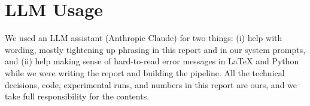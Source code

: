 \documentclass{article}
\begin{document}
\section*{LLM Usage}
We used an LLM assistant (Anthropic Claude) for two things: (i) help
with wording, mostly tightening up phrasing in this report and in our
system prompts, and (ii) help making sense of hard-to-read error
messages in LaTeX and Python while we were writing the report and
building the pipeline. All the technical decisions, code,
experimental runs, and numbers in this report are ours, and we take
full responsibility for the contents.



%
%
\end{document}
